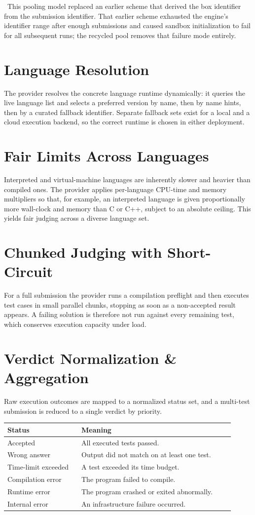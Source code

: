 \documentclass[12pt,a4paper,oneside]{report}
\newcommand{\note}[1]{\par\vspace{3pt}\noindent{\color{tcetaccent}\textbf{Note.}}~#1\par\vspace{3pt}}
\begin{document}
\note{This pooling model replaced an earlier scheme that derived the box
identifier from the submission identifier. That earlier scheme exhausted the
engine's identifier range after enough submissions and caused sandbox
initialization to fail for all subsequent runs; the recycled pool removes that
failure mode entirely.}

\section{Language Resolution}
The provider resolves the concrete language runtime dynamically: it queries the
live language list and selects a preferred version by name, then by name hints,
then by a curated fallback identifier. Separate fallback sets exist for a local
and a cloud execution backend, so the correct runtime is chosen in either
deployment.

\section{Fair Limits Across Languages}
Interpreted and virtual-machine languages are inherently slower and heavier than
compiled ones. The provider applies per-language CPU-time and memory multipliers
so that, for example, an interpreted language is given proportionally more
wall-clock and memory than C or C++, subject to an absolute ceiling. This yields
fair judging across a diverse language set.

\section{Chunked Judging with Short-Circuit}
For a full submission the provider runs a compilation preflight and then executes
test cases in small parallel chunks, stopping as soon as a non-accepted result
appears. A failing solution is therefore not run against every remaining test,
which conserves execution capacity under load.

\section{Verdict Normalization \& Aggregation}
Raw execution outcomes are mapped to a normalized status set, and a multi-test
submission is reduced to a single verdict by priority.
\begin{longtable}{@{}p{0.30\linewidth} p{0.62\linewidth}@{}}
\toprule
\textbf{Status} & \textbf{Meaning}\\
\midrule
\endhead
Accepted & All executed tests passed.\\
Wrong answer & Output did not match on at least one test.\\
Time-limit exceeded & A test exceeded its time budget.\\
Compilation error & The program failed to compile.\\
Runtime error & The program crashed or exited abnormally.\\
Internal error & An infrastructure failure occurred.\\
\bottomrule
\end{longtable}
\end{document}
